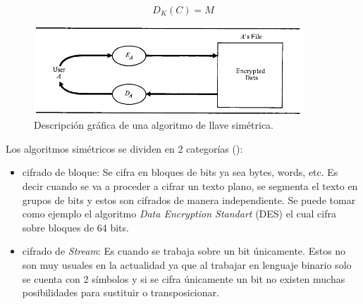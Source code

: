 \begin{equation}\label{eqDescifradoSimetrico}
D_K (C) = M
\end{equation}


\begin{figure}
	\centering
	\includegraphics[width=0.9\textwidth]{./images/figSimmetricKeyAlgorithm}
	\caption{Descripción gráfica de una algoritmo de llave simétrica.}
	\label{figSimmetricKeyAlgorithm}
\end{figure}


Los algoritmos simétricos se dividen en 2 categorías (\cite{bruce}):

\begin{itemize}
\item cifrado de bloque: Se cifra en bloques de bits ya sea bytes, words, etc. Es decir cuando se va a proceder a cifrar un texto plano, se segmenta el texto en grupos de bits y estos son cifrados de manera independiente. Se puede tomar como ejemplo el algoritmo \textit{Data Encryption Standart} (DES) el cual cifra sobre bloques de 64 bits.

\item cifrado de \textit{Stream}: Es cuando se trabaja sobre un bit únicamente. Estos no son muy usuales en la actualidad ya que al trabajar en lenguaje binario solo se cuenta con 2 símbolos y si se cifra únicamente un bit no existen muchas posibilidades para sustituir o transposicionar.
\end{itemize}

